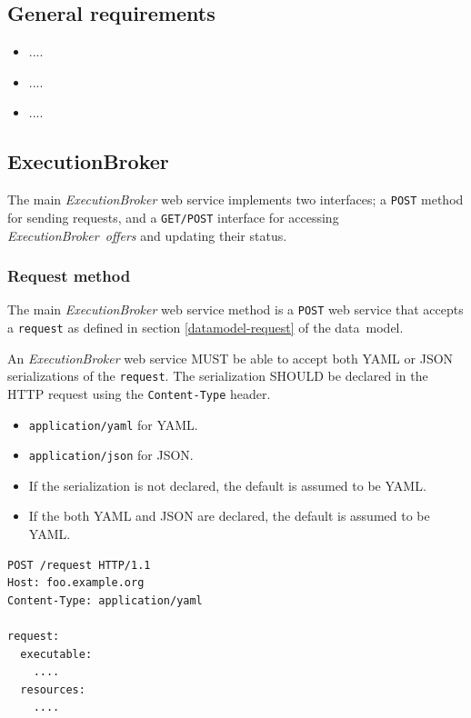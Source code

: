 \documentclass[11pt,a4paper]{ivoa}
\newcommand{\json} {JSON}
\newcommand{\yaml} {YAML}
\newcommand{\datamodel} {data~model}
\newcommand{\webservice} {web service}
\newcommand{\execbrokerclass} {\textit{ExecutionBroker}}
\newcommand{\execoffer}[1] {\textit{ExecutionBroker~offer#1}}
\newcommand{\codeword}[1] {\texttt{#1}}
\begin{document}
\subsection{General requirements}
\label{general-requirements}

\begin{itemize}
    \item ....
    \item ....
    \item ....
\end{itemize}

\subsection{ExecutionBroker}
\label{execution-planner-spec}

The main \execbrokerclass{} \webservice{} implements two interfaces;
a \codeword{POST} method for sending requests, and a \codeword{GET/POST}
interface for accessing \execoffer{s} and updating their status.

\subsubsection{Request method}
\label{execution-planner-request}

The main \execbrokerclass{} \webservice{} method is a \codeword{POST} \webservice{} that accepts
a \codeword{request} as defined in section \ref{datamodel-request} of the \datamodel{}.

An \execbrokerclass{} \webservice{} MUST be able to accept both \yaml{} or \json{} serializations
of the \codeword{request}.
The serialization SHOULD be declared in the HTTP request using the \codeword{Content-Type} header.
\begin{itemize}
    \item \codeword{application/yaml} for \yaml{}.
    \item \codeword{application/json} for \json{}.
    \item If the serialization is not declared, the default is assumed to be \yaml{}.
    \item If the both \yaml{} and \json{} are declared, the default is assumed to be \yaml{}.
\end{itemize}

\begin{lstlisting}[]
POST /request HTTP/1.1
Host: foo.example.org
Content-Type: application/yaml

request:
  executable:
    ....
  resources:
    ....
\end{lstlisting}
\end{document}
